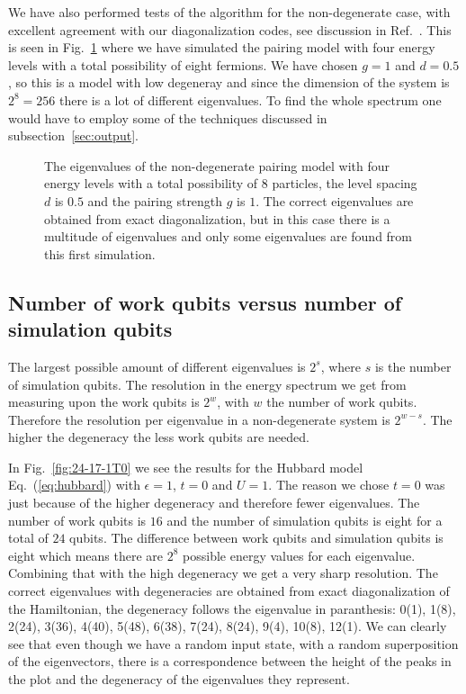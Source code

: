 \documentclass[aps,pra,twocolumn,floatfix]{revtex4}
\begin{document}
 We have also performed tests of the algorithm for
the non-degenerate case, with excellent agreement with our diagonalization codes,
see discussion in Ref.~\cite{rmp75mhj}.
This is seen in Fig.~\ref{fig:P24-17-e3IMd} where we have simulated the pairing model
with four energy levels with a total possibility of eight fermions.
We have chosen $g=1$ and $d=0.5$, so this is a model with low degeneray
and since
the dimension of the system is $2^8= 256$ there is a lot of different
eigenvalues. To find the whole spectrum one would have to employ
some of the techniques discussed in subsection~\ref{sec:output}.
\begin{figure}[h!]
\begin{center}
	\caption{The eigenvalues
          of the non-degenerate pairing model with four energy levels with a total
          possibility of 8  particles, the level spacing $d$ is $0.5$
          and the  pairing strength $g$ is $1$. 
          The correct eigenvalues are obtained from exact
          diagonalization, but in this case there is a multitude of
          eigenvalues and only some eigenvalues are found from this
          first simulation.
        }
	\label{fig:P24-17-e3IMd}
\end{center} 
\end{figure}

\subsection{Number of work qubits versus number of simulation qubits}

The largest possible amount of different eigenvalues is $2^s$, where
$s$ is the number of simulation qubits. The resolution in the energy
spectrum we get from measuring upon the work qubits is $2^w$, with $w$ the number of
work qubits.
Therefore the resolution per eigenvalue in a non-degenerate system is
$2^{w-s}$. The higher the degeneracy the less work qubits are needed. 


In Fig.~\ref{fig:24-17-1T0} we see the results for the Hubbard model
Eq.~(\ref{eq:hubbard})
with $\epsilon=1$, $t=0$ and $U=1$. The reason we chose $t=0$ was just
because of the higher degeneracy and therefore fewer eigenvalues.
 The number of work qubits is $16$
and the number of simulation qubits is eight for a total of $24$
qubits. The difference between work qubits and simulation qubits is
eight which means there are $2^8$ possible energy values for each
eigenvalue. Combining that with the high degeneracy we get a very sharp
resolution. The correct eigenvalues with degeneracies are obtained from exact
diagonalization of  the Hamiltonian, the degeneracy follows the
eigenvalue in paranthesis: 0(1), 1(8), 2(24), 3(36), 4(40), 5(48), 6(38),
7(24), 8(24), 9(4), 10(8), 12(1). We can clearly see that even though
we have a random input state, with a random superposition of the
eigenvectors, there is a correspondence between the height of the
peaks in the plot and the degeneracy of the eigenvalues they represent.
\end{document}
